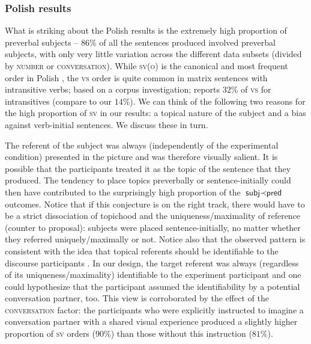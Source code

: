 \documentclass[output=paper]{langscibook}
\begin{document}
\subsubsection{Polish results}

What is striking about the Polish results is the extremely high proportion of preverbal subjects -- $86\%$ of all the sentences produced involved preverbal subjects, with only very little variation across the different data subsets (divided by \textsc{number} or \textsc{conversation}). While \textsc{sv(o)} is the canonical and most frequent order in Polish \citep{Siewierska.Uhlirova1998}, the \textsc{vs} order is quite common in matrix sentences with intransitive verbs; based on a corpus investigation; \citet{Siewierska1993} reports $32\%$ of \textsc{vs} for intransitives (compare to our $14\%$). We can think of the following two reasons for the high proportion of \textsc{sv} in our results: a topical nature of the subject and a bias against verb-initial sentences. We discuss these in turn.

The referent of the subject was always (independently of the experimental condition) presented in the picture and was therefore visually salient. It is possible that the participants treated it as the topic of the sentence that they produced. The tendency to place topics preverbally or sentence-initially could then have contributed to the surprisingly high proportion of the $\textsf{subj}\prec\textsf{pred}$ outcomes. Notice that if this conjecture is on the right track, there would have to be a strict dissociation of topichood and the uniqueness/maximality of reference (counter to  proposal): subjects were placed sentence-initially, no matter whether they referred uniquely/maximally or not. Notice also that the observed pattern is consistent with the idea that topical referents should be identifiable to the discourse participants \citep{Lambrecht1994}. In our design, the target referent was always (regardless of its uniqueness/maximality) identifiable to the experiment participant and one could hypothesize that the participant assumed the identifiability by a potential conversation partner, too. This view is corroborated by the effect of the \textsc{conversation} factor: the participants who were explicitly instructed to imagine a conversation partner with a shared visual experience produced a slightly higher proportion of \textsc{sv} orders ($90\%$) than those without this instruction ($81\%$).
\end{document}
